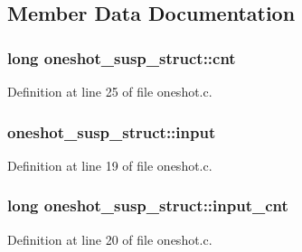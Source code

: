 \subsection{Member Data Documentation}
\subsubsection[{\texorpdfstring{cnt}{cnt}}]{\setlength{\rightskip}{0pt plus 5cm}long oneshot\+\_\+susp\+\_\+struct\+::cnt}\hypertarget{structoneshot__susp__struct_a7ba68bbceb6b008431646991d8d26e03}{}\label{structoneshot__susp__struct_a7ba68bbceb6b008431646991d8d26e03}


Definition at line 25 of file oneshot.\+c.

\subsubsection[{\texorpdfstring{input}{input}}]{ oneshot\+\_\+susp\+\_\+struct\+::input}\hypertarget{structoneshot__susp__struct_a5fb337592bfb3d596a52ea1c4496186c}{}\label{structoneshot__susp__struct_a5fb337592bfb3d596a52ea1c4496186c}


Definition at line 19 of file oneshot.\+c.

\subsubsection[{\texorpdfstring{input\+\_\+cnt}{input_cnt}}]{\setlength{\rightskip}{0pt plus 5cm}long oneshot\+\_\+susp\+\_\+struct\+::input\+\_\+cnt}\hypertarget{structoneshot__susp__struct_ada2841aa8513f42afaad0fdfb2387edc}{}\label{structoneshot__susp__struct_ada2841aa8513f42afaad0fdfb2387edc}


Definition at line 20 of file oneshot.\+c.

